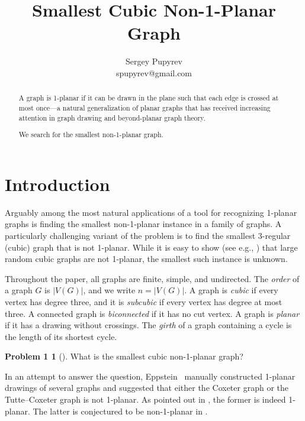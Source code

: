 \documentclass[a4paper,11pt]{article}
\title{Smallest Cubic Non-1-Planar Graph}
\theoremstyle{plain}
\theoremstyle{definition}  %
\begin{document}
\author{
    Sergey Pupyrev \\
    spupyrev@gmail.com
}

\date{}
\maketitle

\begin{abstract}
    A graph
    is 1-planar if it can be drawn in the plane such that each edge is crossed at most
    once---a natural generalization of planar graphs that has received increasing
    attention in graph drawing and beyond-planar graph theory.

    We search for the smallest non-1-planar graph.
\end{abstract}

\section{Introduction}

Arguably among the most natural applications of a tool for recognizing 1-planar graphs is
finding the smallest non-1-planar instance in a family of graphs.
A particularly challenging variant of the problem is to
find the smallest 3-regular (cubic) graph that is not 1-planar. While it is easy to show
(see e.g., \cite{DKMW08}) that large random cubic graphs are not 1-planar, the
smallest such instance is unknown.

Throughout the paper, all graphs are finite, simple, and undirected.  The
\emph{order} of a graph $G$ is $|V(G)|$, and we write $n=|V(G)|$.  A graph is
\emph{cubic} if every vertex has degree three, and it is \emph{subcubic} if
every vertex has degree at most three.  A connected graph is
\emph{biconnected} if it has no cut vertex.  A graph is \emph{planar} if it
has a drawing without crossings.  The \emph{girth} of a graph containing a
cycle is the length of its shortest cycle.

\newtheorem*{problem1b}{Problem 1}
\begin{problem1b}[\cite{11011110_cubic,mathse_cubic,oops}]
    What is the smallest cubic non-1-planar graph?
\end{problem1b}

In an attempt to answer the question, Eppstein~\cite{11011110_cubic} manually constructed 1-planar
drawings of several graphs and suggested that either the Coxeter graph or the Tutte--Coxeter graph
is not 1-planar. As pointed out in \cite{oops}, the former is indeed 1-planar.
The latter is conjectured to be non-1-planar in \cite{oops}.
\end{document}
